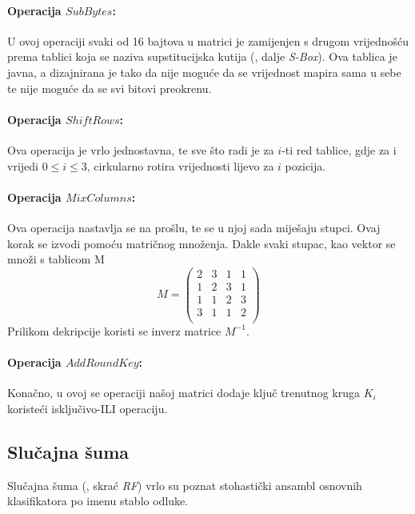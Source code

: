\documentclass[times, utf8, diplomski]{fer}
\begin{document}
\paragraph{Operacija $SubBytes$:} U ovoj operaciji svaki od 16 bajtova u matrici je zamijenjen s drugom vrijednošću prema tablici koja se naziva supstitucijska kutija (, dalje \emph{S-Box}). Ova tablica je javna, a dizajnirana je tako da nije moguće da se vrijednost mapira sama u sebe te nije moguće da se svi bitovi preokrenu.

\paragraph{Operacija $ShiftRows$:} Ova operacija je vrlo jednostavna, te sve što radi je za $i$-ti red tablice, gdje za i vrijedi $0 \le i \le 3$, cirkularno rotira vrijednosti lijevo za $i$ pozicija.

\paragraph{Operacija $MixColumns$:} Ova operacija nastavlja se na prošlu, te se u njoj sada miješaju stupci. Ovaj korak se izvodi pomoću matričnog množenja. Dakle svaki stupac, kao vektor se množi s tablicom M
\[
    M =
    \begin{pmatrix}
        2 & 3 & 1 & 1 \\
        1 & 2 & 3 & 1 \\
        1 & 1 & 2 & 3 \\
        3 & 1 & 1 & 2 \\
    \end{pmatrix}
\]
Prilikom dekripcije koristi se inverz matrice $M^{-1}$.

\paragraph{Operacija $AddRoundKey$:} Konačno, u ovoj se operaciji našoj matrici dodaje ključ trenutnog kruga $K_i$ koristeći isključivo-ILI operaciju.

\subsection{Slučajna šuma}

Slučajna šuma (, skrać \emph{RF}) vrlo su poznat stohastički ansambl osnovnih klasifikatora po imenu stablo odluke.
\end{document}
